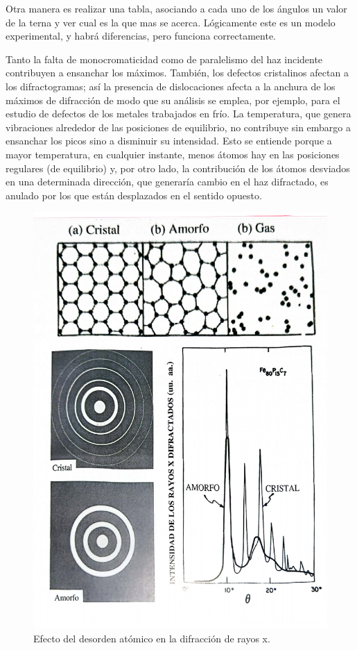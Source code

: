 Otra manera es realizar una tabla, asociando a cada uno de los ángulos un valor de la terna y ver cual es la que mas se acerca. Lógicamente este es un modelo experimental, y habrá diferencias, pero funciona correctamente.  

Tanto la falta de monocromaticidad como de paralelismo del haz incidente contribuyen a ensanchar los máximos. También, los defectos cristalinos afectan a los difractogramas; así la presencia de dislocaciones afecta a la anchura de los máximos de difracción de modo que su análisis se emplea, por ejemplo, para el estudio de defectos de los metales trabajados en frío. La temperatura, que genera vibraciones alrededor de las posiciones de equilibrio, no contribuye sin embargo a ensanchar los picos sino a disminuir su intensidad. Esto se entiende porque a mayor temperatura, en cualquier instante, menos átomos hay en las posiciones regulares (de equilibrio) y, por otro lado, la contribución de los átomos desviados en una determinada dirección, que generaría cambio en el haz difractado, es anulado por los que están desplazados en el sentido opuesto. 
    
\begin{figure}[h!] \centering
    \includegraphics[scale=0.40]{Cuerpo/Ch_02/Fotos_libro 9.pdf}
    \caption{Efecto del desorden atómico en la difracción de rayos x.}
    \label{Fig:02-09}
\end{figure}

